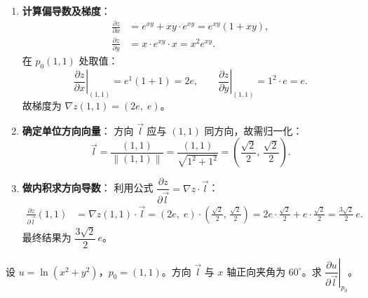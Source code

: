 \documentclass[lang=cn,11pt]{elegantbook}
\begin{document}
\begin{solution}
\begin{enumerate}
  \item \textbf{计算偏导数及梯度}：
  \begin{align*}
  \frac{\partial z}{\partial x} &= e^{xy}+xy\cdot e^{xy}=e^{xy}(1+xy),\\[6pt]
  \frac{\partial z}{\partial y} &= x\cdot e^{xy}\cdot x=x^2e^{xy}.
  \end{align*}
  在 $p_0(1,1)$ 处取值：
  \[
  \left.\frac{\partial z}{\partial x}\right|_{(1,1)}=e^1(1+1)=2e,\qquad
  \left.\frac{\partial z}{\partial y}\right|_{(1,1)}=1^2\cdot e=e.
  \]
  故梯度为 $\nabla z(1,1)=(2e,\;e)$。

  \item \textbf{确定单位方向向量}：
  方向 $\vec l$ 应与 $(1,1)$ 同方向，故需归一化：
  \[
  \vec l=\frac{(1,1)}{\|(1,1)\|}
       =\frac{(1,1)}{\sqrt{1^2+1^2}}
       =\left(\frac{\sqrt2}{2},\,\frac{\sqrt2}{2}\right).
  \]

  \item \textbf{做内积求方向导数}：
  利用公式 $\dfrac{\partial z}{\partial\vec l} = \nabla z \cdot \vec l$：
  \begin{align*}
  \frac{\partial z}{\partial\vec l}(1,1) &= \nabla z(1,1)\cdot\vec l=(2e,\;e)\cdot\left(\frac{\sqrt2}{2},\,\frac{\sqrt2}{2}\right)=2e\cdot\frac{\sqrt2}{2}+e\cdot\frac{\sqrt2}{2}
  =\frac{3\sqrt2}{2}\,e.
  \end{align*}
  最终结果为 $\boxed{\dfrac{3\sqrt2}{2}\,e}$。
\end{enumerate}
\end{solution}

\begin{exercise}[给定角度] \label{ex:grad-log}
设 $u=\ln(x^2+y^2)$，$p_0=(1,1)$。方向 $\vec l$ 与 $x$ 轴正向夹角为 $60^\circ$。求 $\left.\dfrac{\partial u}{\partial\vec l}\right|_{p_0}$。
\end{exercise}
\end{document}
